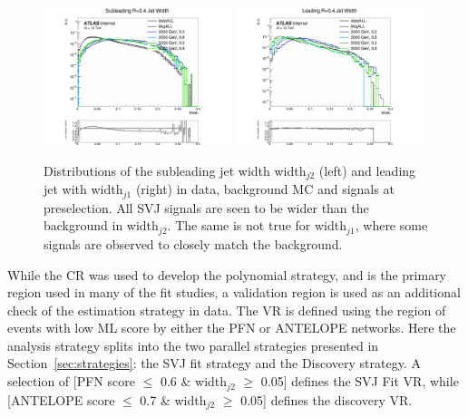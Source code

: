 \begin{figure}[!htbp]
\centering
   \includegraphics[width=0.49\textwidth]{figures/background/jet2_Width_ratio_norm_log_v12p5}
   \includegraphics[width=0.49\textwidth]{figures/background/jet1_Width_ratio_norm_log_v12p5}
    \caption{Distributions of the subleading jet width width$_{j2}$ (left) and leading jet with width$_{j1}$ (right) in data, background MC and signals at preselection. All SVJ signals are seen to be wider than the background in width$_{j2}$. The same is not true for width$_{j1}$, where some signals are observed to closely match the background. 
    \label{fig:jet2width}}
\end{figure}

While the CR was used to develop the polynomial strategy, and is the primary region used in many of the fit studies, a validation region is used as an additional check of the estimation strategy in data.
The VR is defined using the region of events with low ML score by either the PFN or ANTELOPE networks.
Here the analysis strategy splits into the two parallel strategies presented in Section~\ref{sec:strategies}: the SVJ fit strategy and the Discovery strategy.
A selection of [PFN score $\leq$ 0.6 \& width$_{j2}$ $\geq$ 0.05] defines the SVJ Fit VR, while [ANTELOPE score $\leq$ 0.7 \& width$_{j2}$ $\geq$ 0.05] defines the discovery VR. 


